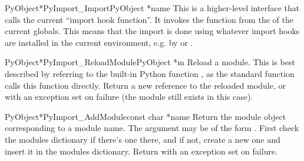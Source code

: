 \begin{cfuncdesc}{PyObject*}{PyImport_Import}{PyObject *name}
  This is a higher-level interface that calls the current ``import
  hook function''.  It invokes the  function
  from the  of the current globals.  This means
  that the import is done using whatever import hooks are installed in
  the current environment, e.g. by 
  or .
\end{cfuncdesc}

\begin{cfuncdesc}{PyObject*}{PyImport_ReloadModule}{PyObject *m}
  Reload a module.  This is best described by referring to the
  built-in Python function , as
  the standard  function calls this function
  directly.  Return a new reference to the reloaded module, or \NULL{}
  with an exception set on failure (the module still exists in this
  case).
\end{cfuncdesc}

\begin{cfuncdesc}{PyObject*}{PyImport_AddModule}{const char *name}
  Return the module object corresponding to a module name.  The
   argument may be of the form .
  First check the modules dictionary if there's one there, and if not,
  create a new one and insert it in the modules dictionary.
  Return \NULL{} with an exception set on failure.
\end{cfuncdesc}

